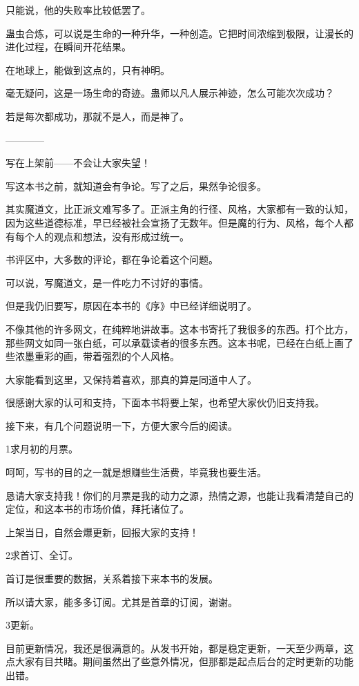 \begin{this_body}
只能说，他的失败率比较低罢了。

蛊虫合炼，可以说是生命的一种升华，一种创造。它把时间浓缩到极限，让漫长的进化过程，在瞬间开花结果。

在地球上，能做到这点的，只有神明。

毫无疑问，这是一场生命的奇迹。蛊师以凡人展示神迹，怎么可能次次成功？

若是每次都成功，那就不是人，而是神了。

------------

写在上架前——不会让大家失望！

写这本书之前，就知道会有争论。写了之后，果然争论很多。

其实魔道文，比正派文难写多了。正派主角的行径、风格，大家都有一致的认知，因为这些道德标准，早已经被社会宣扬了无数年。但是魔的行为、风格，每个人都有每个人的观点和想法，没有形成过统一。

书评区中，大多数的评论，都在争论着这个问题。

可以说，写魔道文，是一件吃力不讨好的事情。

但是我仍旧要写，原因在本书的《序》中已经详细说明了。

不像其他的许多网文，在纯粹地讲故事。这本书寄托了我很多的东西。打个比方，那些网文如同一张白纸，可以承载读者的很多东西。这本书呢，已经在白纸上画了些浓墨重彩的画，带着强烈的个人风格。

大家能看到这里，又保持着喜欢，那真的算是同道中人了。

很感谢大家的认可和支持，下面本书将要上架，也希望大家伙仍旧支持我。

接下来，有几个问题说明一下，方便大家今后的阅读。

1求月初的月票。

呵呵，写书的目的之一就是想赚些生活费，毕竟我也要生活。

恳请大家支持我！你们的月票是我的动力之源，热情之源，也能让我看清楚自己的定位，和这本书的市场价值，拜托诸位了。

上架当日，自然会爆更新，回报大家的支持！

2求首订、全订。

首订是很重要的数据，关系着接下来本书的发展。

所以请大家，能多多订阅。尤其是首章的订阅，谢谢。

3更新。

目前更新情况，我还是很满意的。从发书开始，都是稳定更新，一天至少两章，这点大家有目共睹。期间虽然出了些意外情况，但那都是起点后台的定时更新的功能出错。


\end{this_body}
